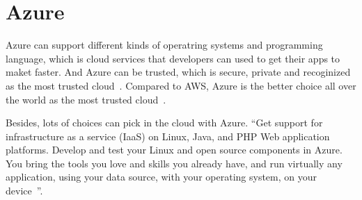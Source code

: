 \section{Azure}

Azure can support different kinds of operatring systems and programming language,
which is cloud services that developers can used to get their apps to maket faster.
And Azure can be trusted, which is secure, private and recoginized as the most trusted
cloud~\cite{www-azure}. Compared to AWS, Azure is the better choice all over the world as the most trusted
cloud~\cite{www-azure-opensource}. 

Besides, lots of choices can pick in the cloud with Azure. ``Get support for infrastructure
as a service (IaaS) on Linux, Java, and PHP Web application platforms. Develop and test 
your Linux and open source components in Azure. You bring the tools you love and skills 
you already have, and run virtually any application, using your data source, with your 
operating system, on your device~\cite{www-azure-choices}''.
